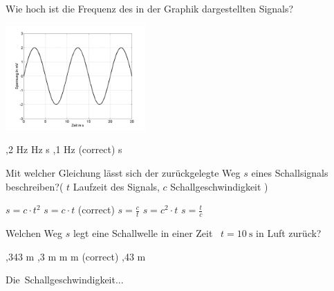 \documentclass[11pt]{exam}
\begin{document}
\setlength{\voffset}{-0.5in}
\setlength{\headsep}{5pt}

\hspace{2mm}
 \hspace{5mm}
\vspace{4mm}

\begin{questions}

\question Wie hoch ist die Frequenz des in der Graphik dargestellten Signals? 

\includegraphics[width=0.4\textwidth]{images/SchallSinus1.png}

\begin{choices}
	,2 Hz
	 Hz
	 s
	,1 Hz (correct)
	 s
\end{choices}

\vspace{3mm}\question Mit welcher Gleichung lässt sich der zurückgelegte Weg \( s \) eines Schallsignals beschreiben?( \( t \) Laufzeit des Signals, \( c \) Schallgeschwindigkeit )

\begin{choices}
	\choice \( s = c \cdot t^2 \)
	\choice \( s=c \cdot t \) (correct)
	\choice \( s= \frac{c}{t} \)
	\choice \( s=c^2 \cdot t \)
	\choice \( s= \frac{t}{c} \)
\end{choices}

\vspace{3mm}\question Welchen Weg \( s \) legt eine Schallwelle in einer Zeit  \( t= \mathrm{10~s} \) in Luft zurück?

\begin{choices}
	,343 m
	,3 m
	 m
	 m (correct)
	,43 m
\end{choices}

\vspace{3mm}\question Die Schallgeschwindigkeit...


\end{questions}
\end{document}
